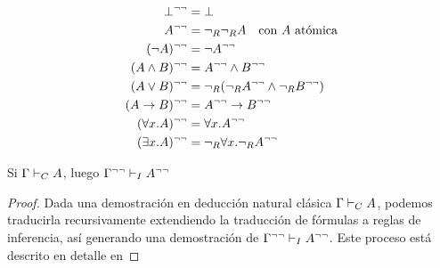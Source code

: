 \begin{definition}
    \begin{align*}
        \bot^{\neg\neg} &= \bot\\
        A^{\neg\neg} &= \neg_R\neg_R A \quad \text{con $A$ atómica}\\
        (\neg A)^{\neg\neg} &= \neg A^{\neg\neg}\\
        (A \wedge B)^{\neg\neg} &= A^{\neg\neg} \wedge B^{\neg\neg}\\
        (A \vee B)^{\neg\neg} &= \neg_R(\neg_RA^{\neg\neg} \wedge \neg_RB^{\neg\neg})\\
        (A \rightarrow B)^{\neg\neg} &= A^{\neg\neg} \rightarrow B^{\neg\neg}\\
        (\forall x . A)^{\neg\neg} &= \forall x . A^{\neg\neg}\\
        (\exists x . A)^{\neg\neg} &= \neg_R \forall x . \neg_R A^{\neg\neg}
    \end{align*}
\end{definition}

\begin{theorem}
    Si $\Gamma \vdash_C A$, luego $\Gamma^{\neg\neg} \vdash_I A^{\neg\neg}$
\end{theorem}
\begin{proof}
    Dada una demostración en deducción natural clásica $\Gamma \vdash_C A$, podemos traducirla recursivamente extendiendo la traducción de fórmulas a reglas de inferencia, así generando una demostración de $\Gamma^{\neg\neg} \vdash_I A^{\neg\neg}$.
    Este proceso está descrito en detalle en 
\end{proof}

\begin{theorem}
    
\end{theorem}

